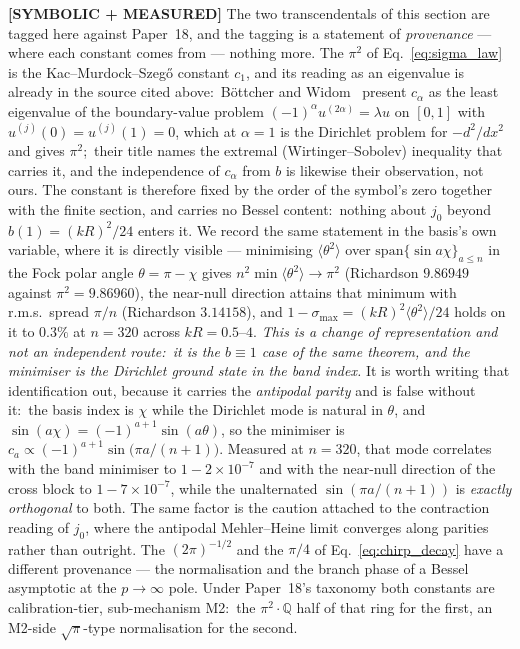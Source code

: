 \documentclass[aps,pra,twocolumn,superscriptaddress,longbibliography]{revtex4-2}
\newcommand{\gvq}[2]{#2}
\begin{document}
\textbf{[SYMBOLIC + MEASURED]} The two transcendentals of this section are
tagged here against Paper~18, and the tagging is a statement of
\emph{provenance} --- where each constant comes from --- nothing more.  The
$\pi^2$ of Eq.~\eqref{eq:sigma_law} is the Kac--Murdock--Szeg\H{o} constant
$c_1$, and its reading as an eigenvalue is already in the source cited above:\
B\"ottcher and Widom~\cite{bottcher_widom2005} present $c_\alpha$ as the least
eigenvalue of the boundary-value problem $(-1)^\alpha u^{(2\alpha)}=\lambda u$
on $[0,1]$ with $u^{(j)}(0)=u^{(j)}(1)=0$, which at $\alpha=1$ is the Dirichlet
problem for $-d^2/dx^2$ and gives $\pi^2$;\ their title names the extremal
(Wirtinger--Sobolev) inequality that carries it, and the independence of
$c_\alpha$ from $b$ is likewise their observation, not ours.  The constant is
therefore fixed by the order of the symbol's zero together with the finite
section, and carries no Bessel content:\ nothing about $j_0$ beyond
$b(1)=(kR)^2/24$ enters it.  We record the same statement in the basis's own
variable, where it is directly visible --- minimising
$\langle\theta^2\rangle$ over $\mathrm{span}\{\sin a\chi\}_{a\le n}$ in the
Fock polar angle $\theta=\pi-\chi$ gives $n^2\min\langle\theta^2\rangle\to\pi^2$
(Richardson $\gvq{p60_window_richardson_pi2}{9.86949}$ against $\pi^2=9.86960$), the near-null direction attains
that minimum with r.m.s.\ spread $\pi/n$ (Richardson $\gvq{p60_window_rms_richardson_pi}{3.14158}$), and
$1-\sigma_{\max}=(kR)^2\langle\theta^2\rangle/24$ holds on it to $0.3\%$ at
$n=320$ across $kR=0.5$--$4$.  \emph{This is a change of representation and not
an independent route:\ it is the $b\equiv1$ case of the same theorem, and the
minimiser is the Dirichlet ground state in the band index.}  It is worth
writing that identification out, because it carries the \emph{antipodal
parity} and is false without it:\ the basis index is $\chi$ while the
Dirichlet mode is natural in $\theta$, and
$\sin(a\chi)=(-1)^{a+1}\sin(a\theta)$, so the minimiser is
$c_a\propto(-1)^{a+1}\sin\bigl(\pi a/(n+1)\bigr)$.  Measured at $n=320$, that
mode correlates with the band minimiser to $1-2\times10^{-7}$ and with the
near-null direction of the cross block to $1-7\times10^{-7}$, while the
unalternated $\sin(\pi a/(n+1))$ is \emph{exactly orthogonal} to both.  The
same factor is the caution attached to the contraction reading of $j_0$, where
the antipodal Mehler--Heine limit converges along parities rather than
outright.  The
$(2\pi)^{-1/2}$ and the $\pi/4$ of Eq.~\eqref{eq:chirp_decay} have a different
provenance --- the normalisation and the branch phase of a Bessel asymptotic at
the $p\to\infty$ pole.  Under Paper~18's taxonomy both constants are
calibration-tier, sub-mechanism M2:\ the $\pi^2\!\cdot\mathbb{Q}$ half of that
ring for the first, an M2-side $\sqrt{\pi}$-type normalisation for the second.
\end{document}
